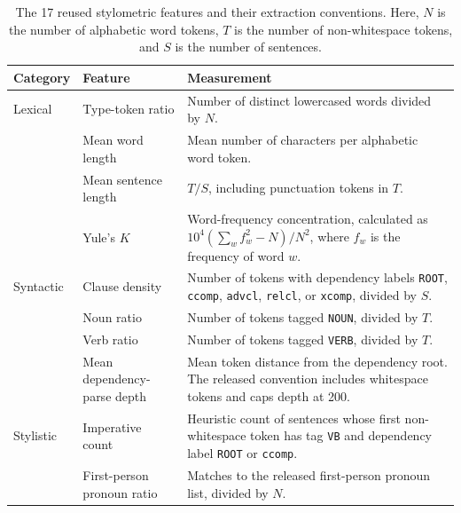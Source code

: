\documentclass[conference]{IEEEtran}
\begin{document}
\begin{table}[!tp]
\centering
\small
\caption{The 17 reused stylometric features and their extraction
conventions. Here, $N$ is the number of alphabetic word tokens,
$T$ is the number of non-whitespace tokens, and $S$ is the number
of sentences.}
\label{tab:stylometric-features}
\renewcommand{\arraystretch}{1.12}
\begin{tabularx}{\textwidth}{
    @{}L{0.14\textwidth}L{0.25\textwidth}Y@{}
}
\toprule
Category & Feature & Measurement \\
\midrule

Lexical
& Type-token ratio
& Number of distinct lowercased words divided by $N$. \\

& Mean word length
& Mean number of characters per alphabetic word token. \\

& Mean sentence length
& $T/S$, including punctuation tokens in $T$. \\

& Yule's $K$
& Word-frequency concentration, calculated as
$10^{4}(\sum_w f_w^2-N)/N^2$, where $f_w$ is the frequency
of word $w$. \\

\midrule

Syntactic
& Clause density
& Number of tokens with dependency labels
\texttt{ROOT}, \texttt{ccomp}, \texttt{advcl},
\texttt{relcl}, or \texttt{xcomp}, divided by $S$. \\

& Noun ratio
& Number of tokens tagged \texttt{NOUN}, divided by $T$. \\

& Verb ratio
& Number of tokens tagged \texttt{VERB}, divided by $T$. \\

& Mean dependency-parse depth
& Mean token distance from the dependency root. The released
convention includes whitespace tokens and caps depth at 200. \\

\midrule

Stylistic
& Imperative count
& Heuristic count of sentences whose first non-whitespace token
has tag \texttt{VB} and dependency label \texttt{ROOT}
or \texttt{ccomp}. \\

& First-person pronoun ratio
& Matches to the released first-person pronoun list, divided by $N$. \\


\end{tabularx}
\end{table}
\end{document}
